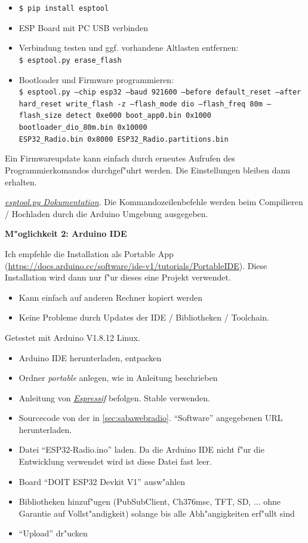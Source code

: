 \documentclass[ngerman,11pt,parskip=half] {scrartcl}
\begin{document}
\begin{itemize}
\item \texttt{\$ pip install esptool}
\item ESP Board mit PC USB verbinden
\item Verbindung testen und ggf. vorhandene Altlasten entfernen:\\
		\texttt{\$ esptool.py erase\_flash}
\item Bootloader und Firmware programmieren:\\
		\texttt{\$ esptool.py --chip esp32  --baud 921600 --before default\_reset --after hard\_reset write\_flash -z --flash\_mode dio --flash\_freq 80m --flash\_size detect 0xe000 boot\_app0.bin 0x1000 bootloader\_dio\_80m.bin 0x10000 \\ESP32\_Radio.bin 0x8000 ESP32\_Radio.partitions.bin}
\end{itemize}

Ein Firmwareupdate kann einfach durch erneutes Aufrufen des Programmierkomandos durchgef"uhrt werden. Die Einstellungen bleiben dann erhalten.

\emph{\href{https://docs.espressif.com/projects/esptool/en/latest/esp32s3/esptool/index.html}{esptool.py Dokumentation}}. Die Kommandozeilenbefehle werden beim Compilieren / Hochladen durch die Arduino Umgebung ausgegeben.

\textbf{M"oglichkeit 2: Arduino IDE}

Ich empfehle die Installation als Portable App (\url{https://docs.arduino.cc/software/ide-v1/tutorials/PortableIDE}). Diese Installation wird dann nur f"ur dieses eine Projekt verwendet.
\begin{itemize}
\item Kann einfach auf anderen Rechner kopiert werden
\item Keine Probleme durch Updates der IDE / Bibliotheken / Toolchain.
\end{itemize}

Getestet mit Arduino V1.8.12 Linux.

\begin{itemize}
\item Arduino IDE herunterladen, entpacken
\item Ordner \emph{portable} anlegen, wie in Anleitung beschrieben
\item Anleitung von \emph{\href{https://docs.espressif.com/projects/arduino-esp32/en/latest/installing.html}{Espressif}} befolgen. Stable verwenden.
\item Sourcecode von der in \ref{sec:sabawebradio}. "`Software"' angegebenen URL herunterladen.
\item Datei "`ESP32-Radio.ino"' laden. Da die Arduino IDE nicht f"ur die Entwicklung verwendet wird ist diese Datei fast leer.
\item Board "`DOIT ESP32 Devkit V1"' ausw"ahlen
\item Bibliotheken hinzuf"ugen (PubSubClient, Ch376msc, TFT, SD, ... ohne Garantie auf Vollst"andigkeit) solange bis alle Abh"angigkeiten erf"ullt sind
\item "`Upload"' dr"ucken
\end{itemize}
\end{document}
